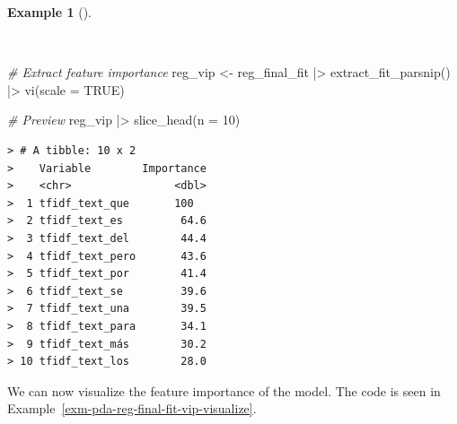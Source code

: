 \documentclass[
  letterpaper,
]{latex/krantz}
\newenvironment{Shaded}{\begin{snugshade}}{\end{snugshade}}
\newcommand{\AttributeTok}[1]{\textcolor[rgb]{0.00,0.00,0.00}{#1}}
\newcommand{\CommentTok}[1]{\textcolor[rgb]{0.00,0.00,0.00}{\textit{#1}}}
\newcommand{\ConstantTok}[1]{\textcolor[rgb]{0.00,0.00,0.00}{#1}}
\newcommand{\DecValTok}[1]{\textcolor[rgb]{0.00,0.00,0.00}{#1}}
\newcommand{\FunctionTok}[1]{\textcolor[rgb]{0.00,0.00,0.00}{#1}}
\newcommand{\NormalTok}[1]{\textcolor[rgb]{0.00,0.00,0.00}{#1}}
\newcommand{\OtherTok}[1]{\textcolor[rgb]{0.00,0.00,0.00}{#1}}
\newcommand{\SpecialCharTok}[1]{\textcolor[rgb]{0.00,0.00,0.00}{#1}}
\theoremstyle{definition}
\newtheorem{example}{Example}[chapter]
\theoremstyle{remark}
\begin{document}
\begin{example}[]\protect\hypertarget{exm-pda-reg-final-fit-vip}{}\label{exm-pda-reg-final-fit-vip}

~

\begin{Shaded}
\begin{Highlighting}[]
\CommentTok{\# Extract feature importance}
\NormalTok{reg\_vip }\OtherTok{\textless{}{-}}
\NormalTok{  reg\_final\_fit }\SpecialCharTok{|\textgreater{}}
  \FunctionTok{extract\_fit\_parsnip}\NormalTok{() }\SpecialCharTok{|\textgreater{}}
  \FunctionTok{vi}\NormalTok{(}\AttributeTok{scale =} \ConstantTok{TRUE}\NormalTok{)}

\CommentTok{\# Preview}
\NormalTok{reg\_vip }\SpecialCharTok{|\textgreater{}}
  \FunctionTok{slice\_head}\NormalTok{(}\AttributeTok{n =} \DecValTok{10}\NormalTok{)}
\end{Highlighting}
\end{Shaded}

\begin{verbatim}
> # A tibble: 10 x 2
>    Variable        Importance
>    <chr>                <dbl>
>  1 tfidf_text_que       100  
>  2 tfidf_text_es         64.6
>  3 tfidf_text_del        44.4
>  4 tfidf_text_pero       43.6
>  5 tfidf_text_por        41.4
>  6 tfidf_text_se         39.6
>  7 tfidf_text_una        39.5
>  8 tfidf_text_para       34.1
>  9 tfidf_text_más        30.2
> 10 tfidf_text_los        28.0
\end{verbatim}

\end{example}

We can now visualize the feature importance of the model. The code is
seen in Example~\ref{exm-pda-reg-final-fit-vip-visualize}.
\end{document}
